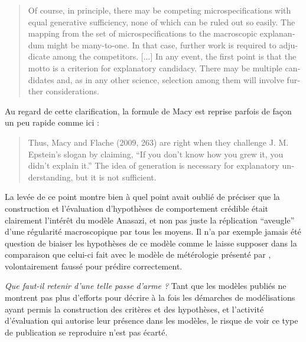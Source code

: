 \foreignblockquote{english}[\cite{Epstein2006}]{Of course, in principle, there may be competing microspecifications with equal generative sufficiency, none of which can be ruled out so easily. The mapping from the set of microspecifications to the macroscopic explanandum might be many-to-one. In that case, further work is required to adjudicate among the competitors. [...] In any event, the first point is that the motto is a criterion for explanatory candidacy. There may be multiple candidates and, as in any other science, selection among them will involve further considerations.} 

Au regard de cette clarification, la formule de Macy est reprise parfois de façon un peu rapide comme ici : 

\foreignblockquote{english}[\cite{Marchionni2013}]{Thus, Macy and Flache (2009, 263) are right when they challenge J. M. Epstein’s slogan by claiming, \enquote{If you don’t know how you grew it, you didn’t explain it.} The idea of generation is necessary for explanatory understanding, but it is not sufficient.}

La levée de ce point montre bien à quel point \textcite{Yanoff2008} avait oublié de préciser que la construction et l'évaluation d'hypothèses de comportement crédible était clairement l'intérêt du modèle Anasazi, et non pas juste la réplication \enquote{aveugle} d'une régularité macroscopique par tous les moyens. Il n'a par exemple jamais été question de biaiser les hypothèses de ce modèle comme le laisse supposer \textcite{Yanoff2008} dans la comparaison que celui-ci fait avec le modèle de métérologie présenté par \textcite{Kuppers2005}, volontairement faussé pour prédire correctement. 

\textit{Que faut-il retenir d'une telle passe d'arme ?} Tant que les modèles publiés ne montrent pas plus d'efforts pour décrire à la fois les démarches de modélisations ayant permis la construction des critères et des hypothèses, et l'activité d'évaluation qui autorise leur présence dans les modèles, le risque de voir ce type de publication se reproduire n'est pas écarté.

